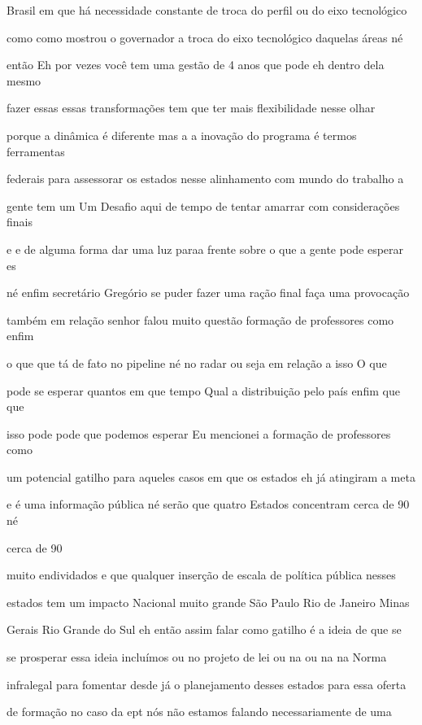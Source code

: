\documentclass[a4paper,12pt]{article}
\begin{document}
Brasil em que há necessidade constante de troca do perfil ou do eixo tecnológico

como como mostrou o governador a troca do eixo tecnológico daquelas áreas né

então Eh por vezes você tem uma gestão de 4 anos que pode eh dentro dela mesmo

fazer essas essas transformações tem que ter mais flexibilidade nesse olhar

porque a dinâmica é diferente mas a a inovação do programa é termos ferramentas

federais para assessorar os estados nesse alinhamento com mundo do trabalho a

gente tem um Um Desafio aqui de tempo de tentar amarrar com considerações finais

e e de alguma forma dar uma luz paraa frente sobre o que a gente pode esperar es

né enfim secretário Gregório se puder fazer uma ração final faça uma provocação

também em relação senhor falou muito questão formação de professores como enfim

o que que tá de fato no pipeline né no radar ou seja em relação a isso O que

pode se esperar quantos em que tempo Qual a distribuição pelo país enfim que que

isso pode pode que podemos esperar Eu mencionei a formação de professores como

um potencial gatilho para aqueles casos em que os estados eh já atingiram a meta

e é uma informação pública né serão que quatro Estados concentram cerca de 90 né

cerca de 90%

muito endividados e que qualquer inserção de escala de política pública nesses

estados tem um impacto Nacional muito grande São Paulo Rio de Janeiro Minas

Gerais Rio Grande do Sul eh então assim falar como gatilho é a ideia de que se

se prosperar essa ideia incluímos ou no projeto de lei ou na ou na na Norma

infralegal para fomentar desde já o planejamento desses estados para essa oferta

de formação no caso da ept nós não estamos falando necessariamente de uma
\end{document}
